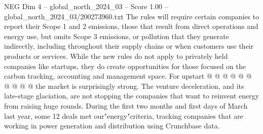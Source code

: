 \begin{textsample}{NEG Dim 4 – global\_north\_2024\_03 – Score 1.00 – global\_north\_2024\_03/200273960.txt}
The rules will require certain companies to report their Scope 1 and 2 emissions, those that result from direct operations and energy use, but omits Scope 3 emissions, or pollution that they generate indirectly, including throughout their supply chains or when customers use their products or services.
While the new rules do not apply to privately held companies like startups, they do create opportunities for those focused on the carbon tracking, accounting and management space.
For upstart @ @ @ @ @ @ @ @ @ @ the market is surprisingly strong.
The venture deceleration, and its late-stage glaciation, are not stopping the companies that want to reinvent energy from raising huge rounds.
During the first two months and first days of March last year, some 12 deals met our"energy"criteria, tracking companies that are working in power generation and distribution using Crunchbase data.

\end{textsample}
